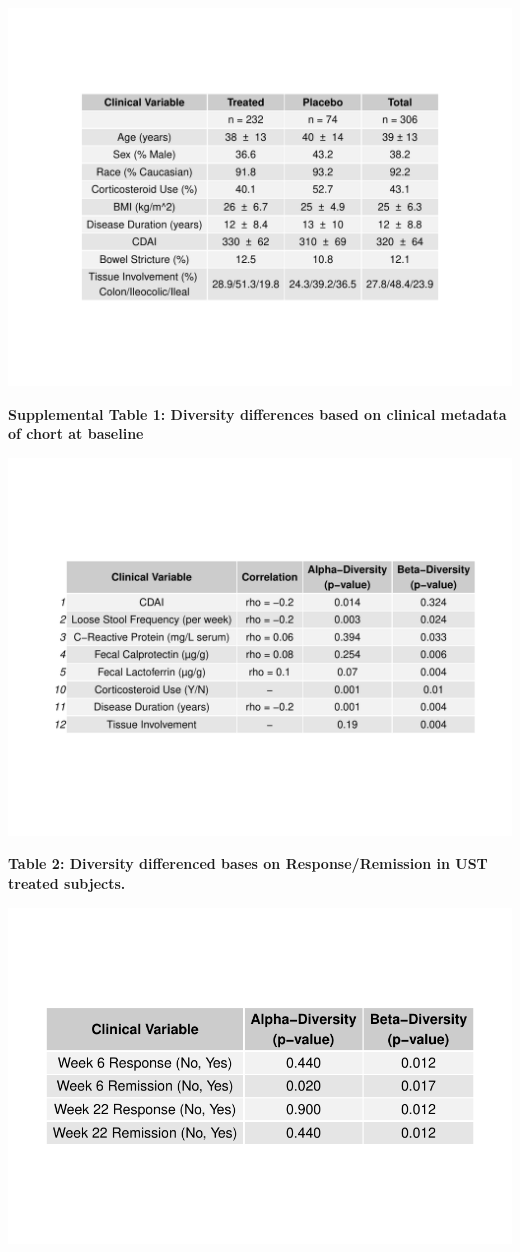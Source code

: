 \documentclass[11pt,]{article}
\begin{document}
\includegraphics{tables/SupTable1_baseline_metadata.pdf}

\newpage

\textbf{Supplemental Table 1: Diversity differences based on clinical
metadata of chort at baseline}

\includegraphics{tables/table1_cohortdiversity.pdf}

\newpage

\textbf{Table 2: Diversity differenced bases on Response/Remission in
UST treated subjects.}

\includegraphics{tables/table2diversity.pdf}
\end{document}
